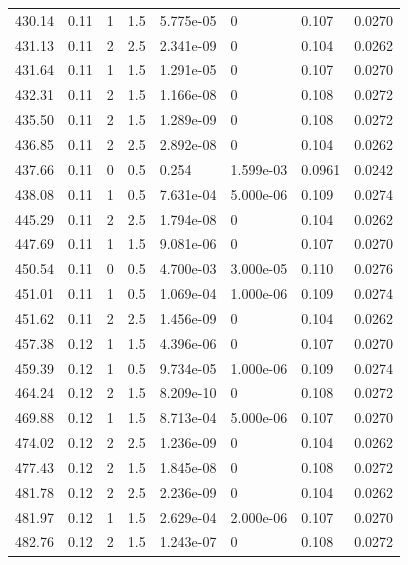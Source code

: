 \documentclass[preview]{standalone}
\begin{document}
{{{\begin{tabular}{L{1.2cm}C{1.2cm} C{0.3cm}C{0.5cm} C{1.4cm}C{1.4cm} C{1.4cm}C{1.4cm}}
  430.14  &  0.11  & 1     & 1.5 &  5.775e-05  & 0  & 0.107 &  0.0270   \\ 
  431.13  &  0.11  & 2     & 2.5 &  2.341e-09  & 0  & 0.104 &  0.0262   \\ 
  431.64  &  0.11  & 1     & 1.5 &  1.291e-05  & 0  & 0.107 &  0.0270   \\ 
  432.31  &  0.11  & 2     & 1.5 &  1.166e-08  & 0  & 0.108 &  0.0272   \\ 
  435.50  &  0.11  & 2     & 1.5 &  1.289e-09  & 0  & 0.108 &  0.0272   \\ 
  436.85  &  0.11  & 2     & 2.5 &  2.892e-08  & 0  & 0.104 &  0.0262   \\ 
  437.66  &  0.11  & 0     & 0.5 &  0.254  & 1.599e-03  & 0.0961 &  0.0242   \\ 
  438.08  &  0.11  & 1     & 0.5 &  7.631e-04  & 5.000e-06  & 0.109 &  0.0274   \\ 
  445.29  &  0.11  & 2     & 2.5 &  1.794e-08  & 0  & 0.104 &  0.0262   \\ 
  447.69  &  0.11  & 1     & 1.5 &  9.081e-06  & 0  & 0.107 &  0.0270   \\ 
  450.54  &  0.11  & 0     & 0.5 &  4.700e-03  & 3.000e-05  & 0.110 &  0.0276   \\ 
  451.01  &  0.11  & 1     & 0.5 &  1.069e-04  & 1.000e-06  & 0.109 &  0.0274   \\ 
  451.62  &  0.11  & 2     & 2.5 &  1.456e-09  & 0  & 0.104 &  0.0262   \\ 
  457.38  &  0.12  & 1     & 1.5 &  4.396e-06  & 0  & 0.107 &  0.0270   \\ 
  459.39  &  0.12  & 1     & 0.5 &  9.734e-05  & 1.000e-06  & 0.109 &  0.0274   \\ 
  464.24  &  0.12  & 2     & 1.5 &  8.209e-10  & 0  & 0.108 &  0.0272   \\ 
  469.88  &  0.12  & 1     & 1.5 &  8.713e-04  & 5.000e-06  & 0.107 &  0.0270   \\ 
  474.02  &  0.12  & 2     & 2.5 &  1.236e-09  & 0  & 0.104 &  0.0262   \\ 
  477.43  &  0.12  & 2     & 1.5 &  1.845e-08  & 0  & 0.108 &  0.0272   \\ 
  481.78  &  0.12  & 2     & 2.5 &  2.236e-09  & 0  & 0.104 &  0.0262   \\ 
  481.97  &  0.12  & 1     & 1.5 &  2.629e-04  & 2.000e-06  & 0.107 &  0.0270   \\ 
  482.76  &  0.12  & 2     & 1.5 &  1.243e-07  & 0  & 0.108 &  0.0272   \\ 

\end{tabular}}}}
\end{document}
